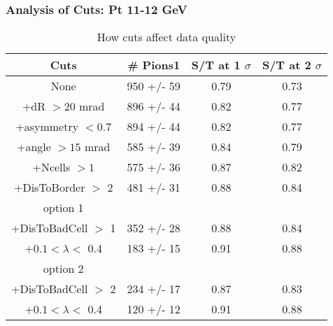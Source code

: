 \frame
{
\frametitle{Analysis of Cuts: Pt 11-12 GeV}
\begin{table}
\caption{How cuts affect data quality}
\centering
\begin{tabular}{c c c c}
\hline\hline
Cuts & \# Pions1 & S/T at 1 $\sigma$ & S/T at 2 $\sigma$ \\ [0.5ex]
\hline
None &  950 +/-   59 & 0.79 & 0.73 \\ %
+dR $> 20$ mrad &  896 +/-   44 & 0.82 & 0.77 \\ %
+asymmetry $< 0.7$ &  894 +/-   44 & 0.82 & 0.77 \\ %
+angle $> 15$ mrad &  585 +/-   39 & 0.84 & 0.79 \\ %
+Ncells $> 1$&  575 +/-   36 & 0.87 & 0.82 \\ %
+DisToBorder $>$ 2 &  481 +/-   31 & 0.88 & 0.84 \\ %
option 1\\
+DisToBadCell $>$ 1&  352 +/-   28 & 0.88 & 0.84 \\ %
+$0.1 < \lambda <$ 0.4 &  183 +/-   15 & 0.91 & 0.88 \\ %
option 2\\
+DisToBadCell $>$ 2&  234 +/-   17 & 0.87 & 0.83 \\ %
+$0.1 < \lambda <$ 0.4 &  120 +/-   12 & 0.91 & 0.88 \\ %
[1ex]
\hline
\end{tabular}
\label{table:nonlin}
\end{table}
}
